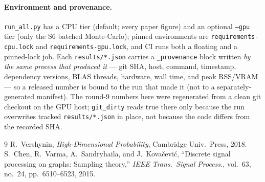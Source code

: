 \documentclass[11pt]{article}
\begin{document}
\paragraph{Environment and provenance.} \texttt{run\_all.py} has a CPU tier
(default; every paper figure) and an optional \texttt{--gpu} tier (only the
S6 batched Monte-Carlo); pinned environments are \texttt{requirements-cpu.lock}
and \texttt{requirements-gpu.lock}, and CI runs both a floating and a
pinned-lock job. Each \texttt{results/*.json} carries a \texttt{\_provenance}
block written \emph{by the same process that produced it} --- git SHA, host,
command, timestamp, dependency versions, BLAS threads, hardware, wall time, and
peak RSS/VRAM --- so a released number is bound to the run that made it (not to
a separately-generated manifest). The round-9 numbers here were regenerated
from a clean git checkout on the GPU host; \texttt{git\_dirty} reads true there
only because the run overwrites tracked \texttt{results/*.json} in place, not
because the code differs from the recorded SHA.

\begin{thebibliography}{9}
R.~Vershynin, \emph{High-Dimensional Probability}, Cambridge Univ.\ Press, 2018.
S.~Chen, R.~Varma, A.~Sandryhaila, and J.~Kova\v{c}evi\'c,
``Discrete signal processing on graphs: Sampling theory,''
\emph{IEEE Trans.\ Signal Process.}, vol.~63, no.~24, pp.~6510--6523, 2015.
\end{thebibliography}
\end{document}
